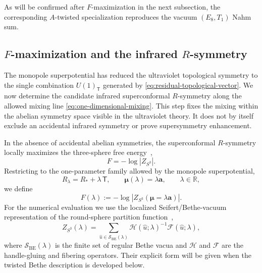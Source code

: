 \documentclass[11pt,a4paper]{article}
\numberwithin{equation}{section}
\begin{document}
As will be confirmed after $F$-maximization in the next subsection, the corresponding $A$-twisted specialization reproduces the vacuum $(E_8,T_1)$ Nahm sum.

\subsection{$F$-maximization and the infrared $R$-symmetry}
\label{subsec:Fmax}

The monopole superpotential has reduced the ultraviolet topological symmetry to the single combination $U(1)_{\mathsf T}$ generated by \eqref{eq:residual-topological-vector}.  We now determine the candidate infrared superconformal $R$-symmetry along the allowed mixing line \eqref{eq:one-dimensional-mixing}.  This step fixes the mixing within the abelian symmetry space visible in the ultraviolet theory.  It does not by itself exclude an accidental infrared symmetry or prove supersymmetry enhancement.

In the absence of accidental abelian symmetries, the superconformal $R$-symmetry locally maximizes the three-sphere free energy~\cite{Jafferis:2010un},
\begin{equation}
  F=-\log\left|Z_{S^3}\right|.
  \label{eq:F-def}
\end{equation}
Restricting to the one-parameter family allowed by the monopole superpotential,
\begin{equation}
  R_\lambda=R_*+\lambda\,\mathsf T,
  \qquad
  \boldsymbol\mu(\lambda)=\lambda\boldsymbol a,
  \qquad \lambda\in\mathbb R,
  \label{eq:Fmax-family}
\end{equation}
we define
\begin{equation}
  F(\lambda):=-\log\left|Z_{S^3}(\boldsymbol\mu=\lambda\boldsymbol a)\right|.
  \label{eq:F-lambda}
\end{equation}
For the numerical evaluation we use the localized Seifert/Bethe-vacuum representation of the round-sphere partition function~\cite{Closset:2017zgf},
\begin{equation}
  Z_{S^3}(\lambda)
  =\sum_{\widehat u\in\mathcal S_{\mathrm{BE}}(\lambda)}
  \mathcal H(\widehat u;\lambda)^{-1}
  \mathcal F(\widehat u;\lambda),
  \label{eq:S3-Bethe-formula}
\end{equation}
where $\mathcal S_{\mathrm{BE}}(\lambda)$ is the finite set of regular Bethe vacua and $\mathcal H$ and $\mathcal F$ are the handle-gluing and fibering operators.  Their explicit form will be given when the twisted Bethe description is developed below.
\end{document}
